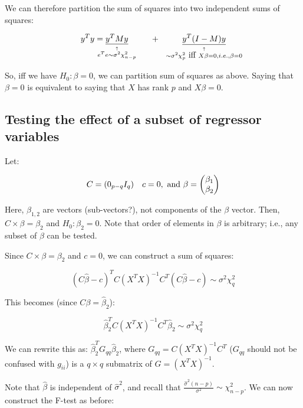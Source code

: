 We can therefore partition the sum of squares into two independent sums of squares:

\begin{equation}
y^T y = \explain{\underline{y^T M y}}{e^T e \sim \sigma^2 \chi_{n-p}^2} \hbox{~~~~~~~~}+\hbox{~~~~~~~~} 
\explain{\underline{y^T (I-M) y}}{ \sim \sigma^2 \chi_p^2 \newline \hbox{ iff } X\beta=0, i.e., \beta=0}
\end{equation}

So, iff we have $H_0: \beta=0$, we can partition sum of squares as above. Saying that $\beta=0$ is equivalent to saying that $X$ has rank $p$ and $X\beta=0$.

\subsection{Testing the effect of a subset of regressor variables}

Let:

\begin{equation}
C= (0_{p-q} I_q) \quad c=0, \hbox{ and } \beta=\begin{pmatrix} \beta_1\\ \beta_2 \end{pmatrix}
\end{equation}


Here, $\beta_{1,2}$ are vectors (sub-vectors?), not components of the $\beta$ vector.
Then, $C\times \beta = \beta_2$ and $H_0: \beta_2=0$. Note that order of elements in $\beta$ is arbitrary; i.e., any subset of $\beta$ can be tested.

Since  $C\times \beta = \beta_2$ and $c=0$, we can construct a sum of squares:

\begin{equation}
(C\hat{\beta} - c)^T C (X^T X)^{-1} C^T (C\hat{\beta} - c) \sim \sigma^2 \chi_q^2
\end{equation}

This becomes (since $C\beta=\hat{\beta}_2$):

\begin{equation}
\hat{\beta}_2^T C (X^T X)^{-1} C^T \hat{\beta}_2 \sim \sigma^2 \chi_q^2
\end{equation}

We can rewrite this as: $\hat{\beta}_2^T G_{qq} \hat{\beta}_2$, where $G_{qq}= C (X^T X)^{-1} C^T$ ($G_{qq}$ should not be confused with $g_{ii}$) is a $q\times q$ submatrix of $G=(X^T X)^{-1}$. 

Note that $\hat{\beta}$ is independent of $\hat{\sigma}^2$, and 
recall that  $\frac{\hat{\sigma}^2 (n-p)}{\sigma^2} \sim \chi_{n-p}^2$. We can now construct the F-test as before:

